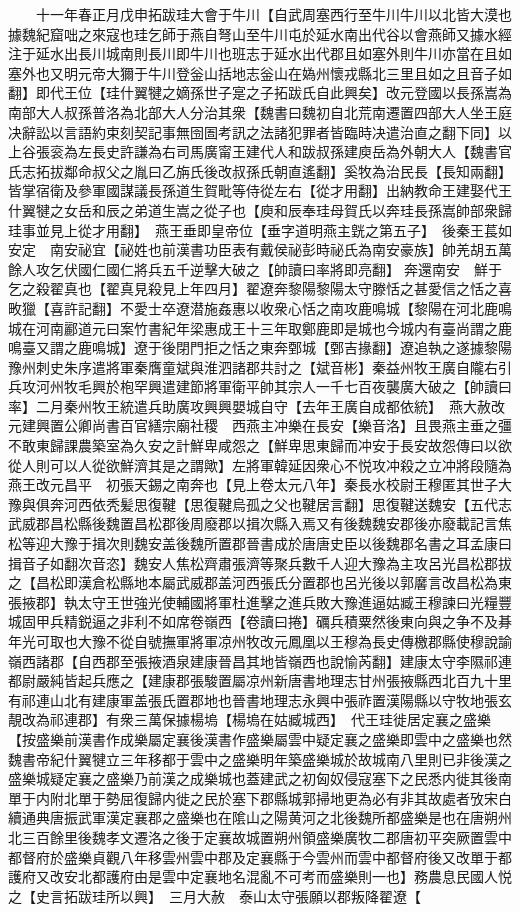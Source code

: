 　　十一年春正月戊申拓跋珪大會于牛川【自武周塞西行至牛川牛川以北皆大漠也據魏紀窟咄之來寇也珪乞師于燕自弩山至牛川屯於延水南出代谷以會燕師又據水經注于延水出長川城南則長川即牛川也班志于延水出代郡且如塞外則牛川亦當在且如塞外也又明元帝大獮于牛川登釡山括地志釡山在媯州懷戎縣北三里且如之且音子如翻】即代王位【珪什翼犍之嫡孫世子寔之子拓跋氏自此興矣】改元登國以長孫嵩為南部大人叔孫普洛為北部大人分治其衆【魏書曰魏初自北荒南遷置四部大人坐王庭决辭訟以言語約束刻契記事無囹圄考訊之法諸犯罪者皆臨時决遣治直之翻下同】以上谷張衮為左長史許謙為右司馬廣甯王建代人和跋叔孫建庾岳為外朝大人【魏書官氏志拓拔鄰命叔父之胤曰乙旃氏後改叔孫氏朝直遙翻】奚牧為治民長【長知兩翻】皆掌宿衛及參軍國謀議長孫道生賀毗等侍從左右【從才用翻】出納教命王建娶代王什翼犍之女岳和辰之弟道生嵩之從子也【庾和辰奉珪母賀氏以奔珪長孫嵩帥部衆歸珪事並見上從才用翻】　燕王垂即皇帝位【垂字道明燕主皝之第五子】　後秦王萇如安定　南安祕宜【祕姓也前漢書功臣表有戴侯祕彭時祕氏為南安豪族】帥羌胡五萬餘人攻乞伏國仁國仁將兵五千逆擊大破之【帥讀曰率將即亮翻】奔還南安　鮮于乞之殺翟真也【翟真見殺見上年四月】翟遼奔黎陽黎陽太守滕恬之甚愛信之恬之喜畋獵【喜許記翻】不愛士卒遼潜施姦惠以收衆心恬之南攻鹿鳴城【黎陽在河北鹿鳴城在河南酈道元曰案竹書紀年梁惠成王十三年取鄭鹿即是城也今城内有臺尚謂之鹿鳴臺又謂之鹿鳴城】遼于後閉門拒之恬之東奔鄄城【鄄吉掾翻】遼追執之遂據黎陽豫州刺史朱序遣將軍秦膺童斌與淮泗諸郡共討之【斌音彬】秦益州牧王廣自隴右引兵攻河州牧毛興於枹罕興遣建節將軍衛平帥其宗人一千七百夜襲廣大破之【帥讀曰率】二月秦州牧王統遣兵助廣攻興興嬰城自守【去年王廣自成都依統】　燕大赦改元建興置公卿尚書百官繕宗廟社稷　西燕主冲樂在長安【樂音洛】且畏燕主垂之彊不敢東歸課農築室為久安之計鮮卑咸怨之【鮮卑思東歸而冲安于長安故怨傳曰以欲從人則可以人從欲鮮濟其是之謂歟】左將軍韓延因衆心不悦攻冲殺之立冲將段隨為燕王改元昌平　初張天錫之南奔也【見上卷太元八年】秦長水校尉王穆匿其世子大豫與俱奔河西依秃髪思復鞬【思復鞬烏孤之父也鞬居言翻】思復鞬送魏安【五代志武威郡昌松縣後魏置昌松郡後周廢郡以揖次縣入焉又有後魏魏安郡後亦廢載記言焦松等迎大豫于揖次則魏安盖後魏所置郡晉書成於唐唐史臣以後魏郡名書之耳孟康曰揖音子如翻次音恣】魏安人焦松齊肅張濟等聚兵數千人迎大豫為主攻呂光昌松郡拔之【昌松即漢倉松縣地本屬武威郡盖河西張氏分置郡也呂光後以郭黁言改昌松為東張掖郡】執太守王世強光使輔國將軍杜進擊之進兵敗大豫進逼姑臧王穆諫曰光糧豐城固甲兵精鋭逼之非利不如席卷嶺西【卷讀曰捲】礪兵積粟然後東向與之争不及朞年光可取也大豫不從自號撫軍將軍凉州牧改元鳳凰以王穆為長史傳檄郡縣使穆說諭嶺西諸郡【自西郡至張掖酒泉建康晉昌其地皆嶺西也說愉芮翻】建康太守李隰祁連都尉嚴純皆起兵應之【建康郡張駿置屬凉州新唐書地理志甘州張掖縣西北百九十里有祁連山北有建康軍盖張氏置郡地也晉書地理志永興中張祚置漢陽縣以守牧地張玄靚改為祁連郡】有衆三萬保據楊塢【楊塢在姑臧城西】　代王珪徙居定襄之盛樂【按盛樂前漢書作成樂屬定襄後漢書作盛樂屬雲中疑定襄之盛樂即雲中之盛樂也然魏書帝紀什翼犍立三年移都于雲中之盛樂明年築盛樂城於故城南八里則已非後漢之盛樂城疑定襄之盛樂乃前漢之成樂城也蓋建武之初匈奴侵寇塞下之民悉内徙其後南單于内附北單于勢屈復歸内徙之民於塞下郡縣城郭掃地更為必有非其故處者攷宋白續通典唐振武軍漢定襄郡之盛樂也在隂山之陽黄河之北後魏所都盛樂是也在唐朔州北三百餘里後魏孝文遷洛之後于定襄故城置朔州領盛樂廣牧二郡唐初平突厥置雲中都督府於盛樂貞觀八年移雲州雲中郡及定襄縣于今雲州而雲中都督府後又改單于都護府又改安北都護府由是雲中定襄地名混亂不可考而盛樂則一也】務農息民國人悦之【史言拓跋珪所以興】　三月大赦　泰山太守張願以郡叛降翟遼【